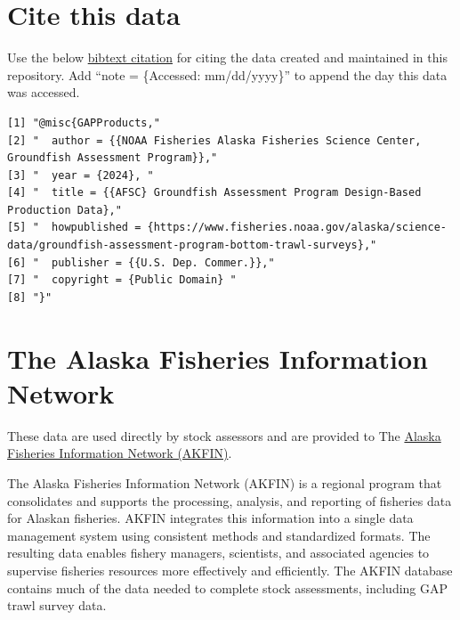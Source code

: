 \documentclass[
  letterpaper,
  oneside,
  open=any]{scrbook}
\begin{document}
\section*{Cite this data}\label{cite-this-data-1}


Use the below
\href{https://github.com/afsc-gap-products/gap_products/blob/main/content/references.bib}{bibtext
citation} for citing the data created and maintained in this repository.
Add ``note = \{Accessed: mm/dd/yyyy\}'' to append the day this data was
accessed.

\begin{verbatim}
[1] "@misc{GAPProducts,"                                                                                                       
[2] "  author = {{NOAA Fisheries Alaska Fisheries Science Center, Groundfish Assessment Program}},"                            
[3] "  year = {2024}, "                                                                                                        
[4] "  title = {{AFSC} Groundfish Assessment Program Design-Based Production Data},"                                           
[5] "  howpublished = {https://www.fisheries.noaa.gov/alaska/science-data/groundfish-assessment-program-bottom-trawl-surveys},"
[6] "  publisher = {{U.S. Dep. Commer.}},"                                                                                     
[7] "  copyright = {Public Domain} "                                                                                           
[8] "}"                                                                                                                        
\end{verbatim}

\section*{The Alaska Fisheries Information
Network}\label{the-alaska-fisheries-information-network}


These data are used directly by stock assessors and are provided to The
\href{https://akfin.psmfc.org/}{Alaska Fisheries Information Network
(AKFIN)}.

The Alaska Fisheries Information Network (AKFIN) is a regional program
that consolidates and supports the processing, analysis, and reporting
of fisheries data for Alaskan fisheries. AKFIN integrates this
information into a single data management system using consistent
methods and standardized formats. The resulting data enables fishery
managers, scientists, and associated agencies to supervise fisheries
resources more effectively and efficiently. The AKFIN database contains
much of the data needed to complete stock assessments, including GAP
trawl survey data.
\end{document}

